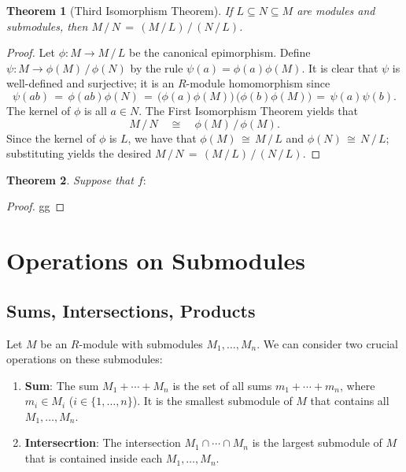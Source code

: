 \documentclass[11pt]{article}
\newtheorem{theorem}{Theorem}
\begin{document}
\begin{adjustwidth}{0.5cm}{}
  \begin{theorem}[Third Isomorphism Theorem]
    If $L \subseteq N \subseteq  M$ are modules and submodules, then $M \, / \, N \, = \, (M \, / \, L) \, / \, (N \, / \, L)$.
  \end{theorem}
  \begin{proof}
    Let $\phi : M \to M \, / \, L$ be the canonical epimorphism. Define $\psi : M \to \phi(M) \, / \, \phi(N)$ by the rule $\psi(a) = \phi(a)\phi(M)$. It is clear that $\psi$ is well-defined and surjective; it is an $R$-module homomorphism since
    \[
      \psi(ab) \, = \, \phi(ab) \phi(N) \, = \, \big(\phi(a) \phi(M)\big) \, \big(\phi(b) \phi(M) \big) \, = \, \psi(a) \psi(b).
    \]
    The kernel of $\phi$ is all $a \in N$. The First Isomorphism Theorem yields that
    \[
      M \, / \, N \quad \cong \quad \phi(M) \, / \, \phi(M).
    \]
    Since the kernel of $\phi$ is $L$, we have that $\phi(M) \, \cong \, M \, / \, L$ and $\phi(N) \, \cong \, N \, / \, L$; substituting yields the desired $M \, / \, N \, = \, (M \, / \, L) \, / \, (N \, / \, L)$.
  \end{proof}
\end{adjustwidth}

\begin{adjustwidth}{0.5cm}{}
  \begin{theorem}
    Suppose that $f : $
  \end{theorem}
  \begin{proof}
    gg
  \end{proof}
\end{adjustwidth}


\section{Operations on Submodules}


\subsection{Sums, Intersections, Products}

Let $M$ be an $R$-module with submodules $M_{1}, \ldots, M_{n}$. We can consider two crucial operations on these submodules:
\begin{enumerate}
	\item \textbf{Sum}: The sum $M_{1} + \cdots + M_{n}$ is the set of all sums $m_{1} + \cdots + m_{n}$, where $m_{i} \in M_{i}$ ($i \in \{ 1, \ldots, n \}$). It is the smallest submodule of $M$ that contains all $M_{1}, \ldots, M_{n}$.
	\item \textbf{Intersecrtion}: The intersection $M_{1} \cap \cdots \cap M_{n}$ is the largest submodule of $M$ that is contained inside each $M_{1}, \ldots, M_{n}$.
\end{enumerate}
\end{document}
